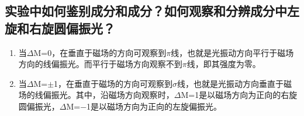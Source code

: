 \documentclass[a4paper]{article}
\begin{document}
\subsection{实验中如何鉴别成分和成分？如何观察和分辨成分中左旋和右旋圆偏振光？}
\begin{enumerate}
\item 当$\Delta$M=0，在垂直于磁场的方向可观察到$\pi$线，也就是光振动方向平行于磁场方向的线偏振光。而平行于磁场方向观察不到$\pi$线，即其强度为零。
\item 当$\Delta$M=$\pm$1，在垂直于磁场的方向可观察到$\sigma$线，也就是光振动方向垂直于磁场的线偏振光。其中，沿磁场方向观察时，$\Delta$M=1是以磁场方向为正向的右旋圆偏振光，$\Delta$M=$-$1是以磁场方向为正向的左旋偏振光。
\end{enumerate}

\nocite{jiaocai}

\end{document}
